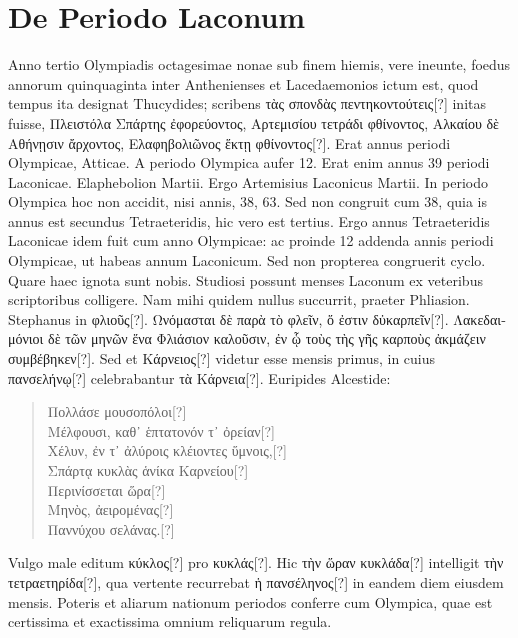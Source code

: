 \section{De Periodo Laconum}
Anno tertio Olympiadis octagesimae nonae sub finem hiemis,
vere ineunte, foedus annorum quinquaginta inter Anthenienses
et Lacedaemonios ictum est, quod tempus ita designat Thucydides;
scribens \textgreek{τὰς σπονδὰς πεντηκοντούτεις[?]} initas fuisse,
 \textgreek{Πλειστόλα Σπάρτης
ἐφορεύοντος, Αρτεμισίου τετράδι φθίνοντος, Αλκαίου δὲ Αθήνῃσιν ἄρχοντος,
 Ελαφηβολιῶνος
ἕκτῃ φθίνοντος[?]}.
Erat annus  periodi Olympicae,  Atticae.
A periodo Olympica aufer 12.
Erat enim annus 39 periodi Laconicae.
Elaphebolion  Martii.
Ergo Artemisius Laconicus  Martii.
In periodo Olympica hoc non accidit, nisi annis, 38, 63.
Sed non congruit
cum 38, quia is annus est secundus Tetraeteridis, hic vero est
tertius.
%
Ergo annus Tetraeteridis Laconicae idem fuit cum
 anno Olympicae:
ac proinde 12 addenda annis periodi Olympicae, ut habeas
annum Laconicum.
Sed non propterea congruerit cyclo.
Quare
haec ignota sunt nobis.
Studiosi possunt menses Laconum ex veteribus
scriptoribus colligere.
Nam mihi quidem nullus succurrit, praeter
Phliasion.
Stephanus in \textgreek{φλιοῦς[?]}.
\textgreek{Ωνόμασται δὲ παρὰ τὸ φλεῖν, ὅ ἐστιν δὐκαρπεῖν[?]}.
\textgreek{Λακεδαιμόνιοι δὲ τῶν μηνῶν ἕνα Φλιάσιον καλοῦσιν,
 ἐν ᾧ τοὺς τὴς γῆς
καρποὺς ἀκμάζειν συμβέβηκεν[?]}.
Sed et \textgreek{Κάρνειος[?]} videtur esse mensis primus,
in cuius \textgreek{πανσελήνῳ[?]} celebrabantur \textgreek{τὰ Κάρνεια[?]}.
Euripides Alcestide:
\begin{verse}
  \textgreek{Πολλάσε μουσοπόλοι[?]}\\
  \textgreek{Μέλφουσι, καθ᾽ ἑπτατονόν τ᾽ ὀρείαν[?]}\\
  \textgreek{Χέλυν, ἐν τ᾿ ἀλύροις κλέιοντες ὕμνοις,[?]}\\
  \textgreek{Σπάρτᾳ κυκλὰς ἁνίκα Καρνείου[?]}\\
  \textgreek{Περινίσσεται ὥρα[?]}\\
  \textgreek{Μηνὸς, ἀειρομένας[?]}\\
  \textgreek{Παννύχου σελάνας.[?]}
\end{verse}
Vulgo male editum \textgreek{κύκλος[?]} pro \textgreek{κυκλάς[?]}.
Hic \textgreek{τὴν ὥραν κυκλάδα[?]} intelligit
\textgreek{τὴν τετραετηρίδα[?]}, qua vertente recurrebat
 \textgreek{ἡ πανσέληνος[?]} in eandem
diem eiusdem mensis.
Poteris et aliarum nationum periodos
conferre cum Olympica, quae est certissima et exactissima omnium
reliquarum regula.
